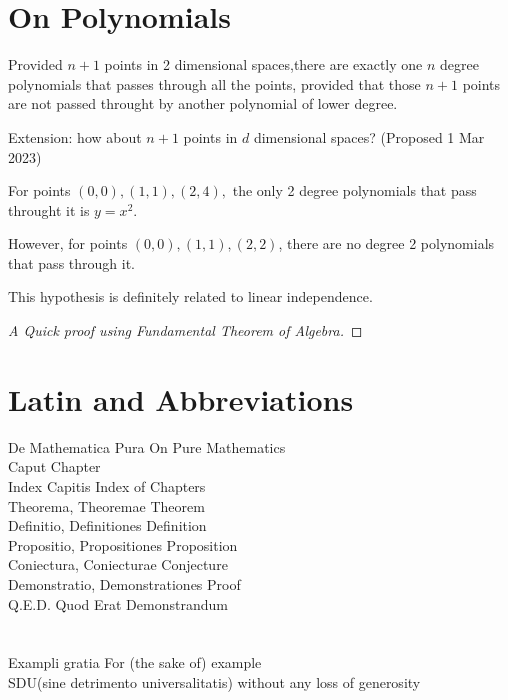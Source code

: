 \documentclass[../note.tex]{subfiles}
\begin{document}
\renewcommand{\thechapter}{\Roman{chapter}}
\chapter{On Polynomials}
\label{appendix:hypotheises}
\begin{hypothesis}
	Provided $n+1$ points in 2 dimensional spaces,there are exactly one $n$ degree polynomials that passes through all the points, provided that those $n+1$ points are not passed throught by another polynomial of lower degree.

	Extension: how about $n+1$ points in $d$ dimensional spaces? (Proposed 1 Mar 2023)
\end{hypothesis}

\begin{example}
	For points $(0,0), (1,1), (2,4),$ the only 2 degree polynomials that pass throught it is $y=x^2$.

	However, for points $(0,0), (1,1), (2,2)$, there are no degree 2 polynomials that pass through it. 

	This hypothesis is definitely related to linear independence.
\end{example}

\begin{proof}[A Quick proof using Fundamental Theorem of Algebra]

\end{proof}

\chapter{Latin and Abbreviations}
De Mathematica Pura \hfill On Pure Mathematics\\
Caput \hfill Chapter\\
Index Capitis \hfill Index of Chapters\\
Theorema, Theoremae \dotfill  Theorem\\
Definitio, Definitiones \hfill Definition\\
Propositio, Propositiones \hfill Proposition\\
Coniectura, Coniecturae \hfill Conjecture\\
Demonstratio, Demonstrationes \hfill Proof\\
Q.E.D. \hfill Quod Erat Demonstrandum \\
\\
\\
\noindent Exampli gratia \hfill For (the sake of) example\\
SDU(sine detrimento universalitatis) \hfill without any loss of generosity\\
\end{document}
